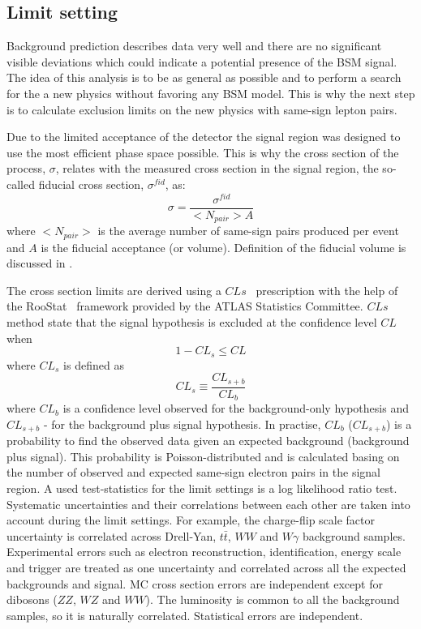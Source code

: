 \subsection{Limit setting}

Background prediction describes data very well and there are no significant visible deviations which could indicate a potential presence of the BSM signal.
The idea of this analysis is to be as general as possible and to perform a search for the a new physics without favoring any BSM model.
This is why the next step is to calculate exclusion limits on the new physics with same-sign lepton pairs.

Due to the limited acceptance of the detector the signal region was designed to use the most efficient phase space possible.
This is why the cross section of the process, $\sigma$, relates with the measured cross section in the signal region, the so-called fiducial cross section, $\sigma^{fid}$, as:
\begin{equation}
 \sigma = \dfrac{\sigma^{fid}}{<N_{pair}>A}
 \label{eq:cross_section}
\end{equation}
where $<N_{pair}>$ is the average number of same-sign pairs produced per event and $A$ is the fiducial acceptance (or volume).
Definition of the fiducial volume is discussed in .

The cross section limits are derived using a $CLs$~\cite{CLs_tecnique,CLs_2} prescription with the help of the RooStat~\cite{RooStat_project} framework 
provided by the ATLAS Statistics Committee. $CLs$ method state that the signal hypothesis is excluded at the confidence level $CL$ when
\begin{equation}
 1 - CL_s \leq CL
\end{equation}
where $CL_s$ is defined as
\begin{equation}
 CL_s \equiv \dfrac{CL_{s+b}}{CL_b}
\end{equation}
where $CL_b$ is a confidence level observed for the background-only hypothesis and $CL_{s+b}$ - for the background plus signal hypothesis.
In practise, $CL_b$ ($CL_{s+b}$) is a probability to find the observed data given an expected background (background plus signal).
This probability is Poisson-distributed and is calculated basing on the number of observed and expected same-sign electron pairs in the signal region.
A used test-statistics for the limit settings is a log likelihood ratio test.
Systematic uncertainties and their correlations between each other are taken into account during the limit settings.
For example, the charge-flip scale factor uncertainty is correlated across Drell-Yan, $t\bar{t}$, $WW$ and $W\gamma$ background samples.
Experimental errors such as electron reconstruction, identification, energy scale and trigger 
are treated as one uncertainty and correlated across all the expected backgrounds and signal.
MC cross section errors are independent except for dibosons ($ZZ$, $WZ$ and $WW$).
The luminosity is common to all the background samples, so it is naturally correlated.
Statistical errors are independent.

